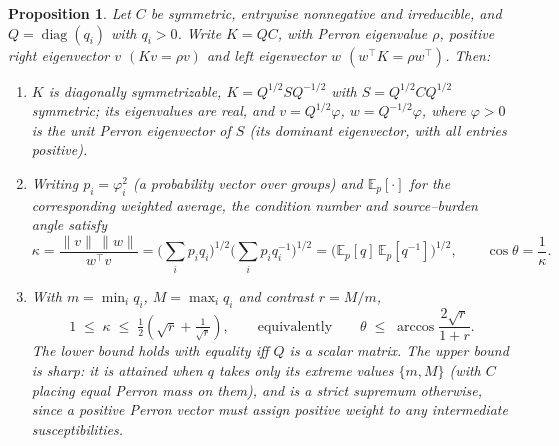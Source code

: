 \documentclass[12pt]{article}
\newtheorem{proposition}[theorem]{Proposition}
\begin{document}
\begin{proposition}\label{prop:kant}
Let $C$ be symmetric, entrywise nonnegative and irreducible, and $Q=\operatorname{diag}(q_i)$ with $q_i>0$. Write $K=QC$, with Perron eigenvalue $\rho$, positive right eigenvector $v$ $(Kv=\rho v)$ and left eigenvector $w$ $(w^{\top}K=\rho w^{\top})$. Then:
\begin{enumerate}
\item[\textup{(i)}] $K$ is diagonally symmetrizable, $K=Q^{1/2}SQ^{-1/2}$ with $S=Q^{1/2}CQ^{1/2}$ symmetric; its eigenvalues are real, and $v=Q^{1/2}\varphi$, $w=Q^{-1/2}\varphi$, where $\varphi>0$ is the unit Perron eigenvector of $S$ (its dominant eigenvector, with all entries positive).
\item[\textup{(ii)}] Writing $p_i=\varphi_i^{2}$ \textup{(}a probability vector over groups\textup{)} and $\mathbb{E}_p[\cdot]$ for the corresponding weighted average, the condition number and source--burden angle satisfy
\begin{equation}
\kappa=\frac{\lVert v\rVert\,\lVert w\rVert}{w^{\top}v}
=\Big(\textstyle\sum_i p_i q_i\Big)^{1/2}\Big(\sum_i p_i q_i^{-1}\Big)^{1/2}
=\big(\mathbb{E}_p[q]\,\mathbb{E}_p[q^{-1}]\big)^{1/2},
\qquad \cos\theta=\frac1\kappa .
\end{equation}
\item[\textup{(iii)}] With $m=\min_i q_i$, $M=\max_i q_i$ and contrast $r=M/m$,
\begin{equation}
1\;\le\;\kappa\;\le\;\tfrac12\!\left(\sqrt{r}+\tfrac{1}{\sqrt{r}}\right),
\qquad\text{equivalently}\qquad
\theta\;\le\;\arccos\frac{2\sqrt{r}}{1+r}.
\end{equation}
The lower bound holds with equality iff $Q$ is a scalar matrix. The upper bound is sharp: it is attained when $q$ takes only its extreme values $\{m,M\}$ (with $C$ placing equal Perron mass on them), and is a strict supremum otherwise, since a positive Perron vector must assign positive weight to any intermediate susceptibilities.
\end{enumerate}
\end{proposition}
\end{document}
